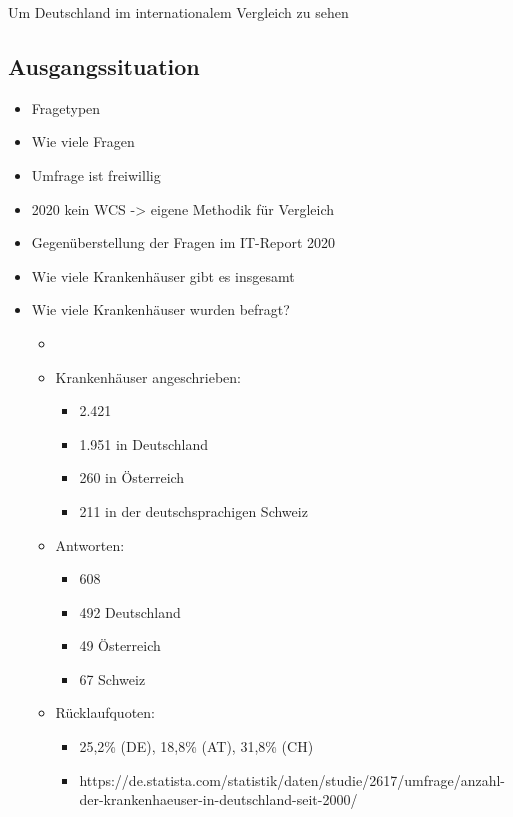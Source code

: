Um Deutschland im internationalem Vergleich zu sehen
\subsection{Ausgangssituation}
\begin{itemize}
	\item Fragetypen
	\item Wie viele Fragen
	\item Umfrage ist freiwillig
	\item 2020 kein WCS -> eigene Methodik für Vergleich
	\item Gegenüberstellung der Fragen im IT-Report 2020 \parencite{huebner2020}
	\item Wie viele Krankenhäuser gibt es insgesamt
	\item Wie viele Krankenhäuser wurden befragt? \parencite[31]{huebner2020}
	\begin{itemize}
		\item \cite[296]{huebner2020}
		\item Krankenhäuser angeschrieben:
		\begin{itemize}
			\item 2.421
			\item 1.951 in Deutschland
			\item 260 in Österreich 
			\item 211 in der deutschsprachigen Schweiz
		\end{itemize}
		\item Antworten:
		\begin{itemize}
			\item 608 
			\item 492 Deutschland
			\item 49 Österreich
			\item 67 Schweiz
		\end{itemize}
		\item Rücklaufquoten:
		\begin{itemize}
			\item 25,2\% (DE), 18,8\% (AT), 31,8\% (CH)
			\item https://de.statista.com/statistik/daten/studie/2617/umfrage/anzahl-der-krankenhaeuser-in-deutschland-seit-2000/
		\end{itemize}
	\end{itemize}
\end{itemize}
